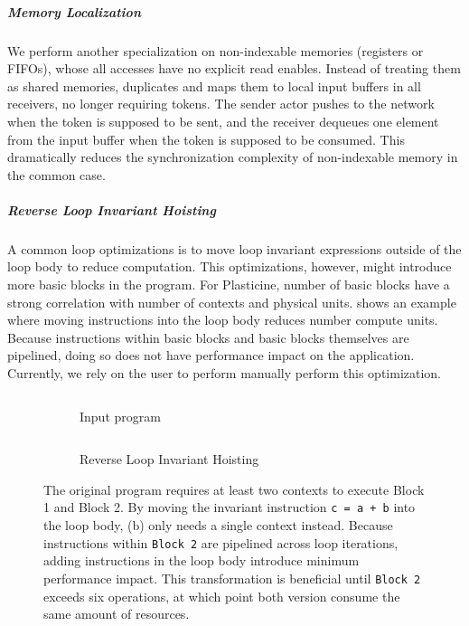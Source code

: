 \subparagraph{Memory Localization}
We perform another specialization on non-indexable memories (registers or FIFOs), whose all accesses have no explicit read enables.
Instead of treating them as shared memories, \name{} duplicates and maps them to local input buffers in all receivers, no longer requiring tokens.
The sender actor pushes to the network when the token is supposed to be sent, and the receiver dequeues one element from the input buffer when the token is supposed to be consumed.
This dramatically reduces the synchronization complexity of non-indexable memory in the common case.

\subparagraph{Reverse Loop Invariant Hoisting}
A common loop optimizations is to move loop invariant expressions outside of the loop body to reduce
computation. This optimizations, however, might introduce more basic blocks in the program.
For Plasticine, number of basic blocks have a strong correlation with number of contexts and
physical units.  shows an example where moving instructions into the loop
body reduces number compute units. Because instructions within basic blocks and basic blocks
themselves are pipelined, doing so does not have performance impact on the application.
Currently, we rely on the user to perform manually perform this optimization.

\begin{figure}
\centering
\hfill
\begin{subfigure}[b]{0.4\textwidth}
\inputminted{python}{code/hoisting.py}
\caption{Input program}
\end{subfigure}
\hfill
\begin{subfigure}[b]{0.4\textwidth}
\inputminted{python}{code/reversehoisting.py}
\caption{Reverse Loop Invariant Hoisting}
\end{subfigure}
\hfill
\caption[Reverse Loop Invariant Hoisting]{
  The original program requires at least two contexts to execute Block 1 and Block 2.
  By moving the invariant instruction \texttt{c = a + b} into the loop body, (b) only needs a single
  context instead. Because instructions within \texttt{Block 2} are pipelined across loop
  iterations, adding instructions in the loop body introduce minimum performance impact.
  This transformation is beneficial until \texttt{Block 2} exceeds six operations, at which point
  both version consume the same amount of resources.
}
\label{fig:reversehoisting}
\end{figure}

